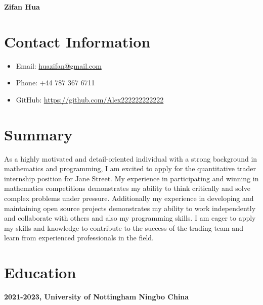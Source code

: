 \documentclass{article}
\begin{document}
\begin{center}
    \textbf{\Large Zifan Hua}
\end{center}

\section*{Contact Information}
\begin{itemize}[leftmargin=*]
    \item Email: \href{mailto:huazifan@gmail.com}{huazifan@gmail.com}
    \item Phone: +44 787 367 6711
    \item GitHub: \href{https://github.com/Alex222222222222}{https://github.com/Alex222222222222}
\end{itemize}

\section*{Summary}
As a highly motivated and detail-oriented individual with a strong background in mathematics and programming, I am excited to apply for the quantitative trader internship position for Jane Street. 
My experience in participating and winning in mathematics competitions demonstrates my ability to think critically and solve complex problems under pressure.
Additionally my experience in developing and maintaining open source projects demonstrates my ability to work independently and collaborate with others and also my programming skills.
I am eager to apply my skills and knowledge to contribute to the success of the trading team and learn from experienced professionals in the field.

\section*{Education}
    \textbf{2021-2023, University of Nottingham Ningbo China}
\end{document}
